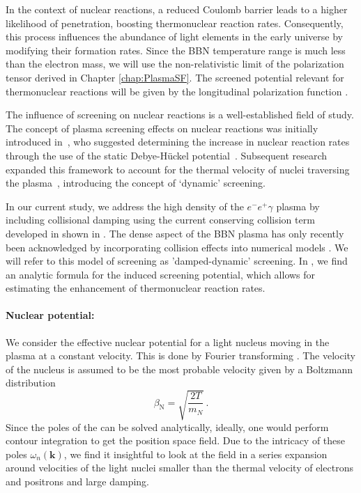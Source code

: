 In the context of nuclear reactions, a reduced Coulomb barrier leads to a higher likelihood of penetration, boosting thermonuclear reaction rates. Consequently, this process influences the abundance of light elements in the early universe by modifying their formation rates. Since the BBN temperature range is much less than the electron mass, we will use the non-relativistic limit of the polarization tensor derived in Chapter \ref{chap:PlasmaSF}. The screened potential relevant for thermonuclear reactions will be given by the longitudinal polarization function .

The influence of screening on nuclear reactions is a well-established field of study. The concept of plasma screening effects on nuclear reactions was initially introduced in~\cite{Salpeter:1954nc}, who suggested determining the increase in nuclear reaction rates through the use of the static Debye-Hückel potential~\cite{Debye:1923,Salpeter:1969apj,Famiano:2016hhs}. Subsequent research expanded this framework to account for the thermal velocity of nuclei traversing the plasma~\cite{Hwang:2021kno,Carraro:1988apj,Gruzinov:1997as,Opher:1999jh,Yao:2016cjs}, introducing the concept of `dynamic' screening. 

In our current study, we address the high density of the $e^-e^+\gamma$ plasma by including collisional damping using the current conserving collision term developed in \cite{Formanek:2021blc} shown in . The dense aspect of the BBN plasma has only recently been acknowledged by incorporating collision effects into numerical models \cite{Sasankan:2019oee,Kedia:2020xdc}. We will refer to this model of screening as 'damped-dynamic' screening. In \cite{Grayson:2023flr}, we find an analytic formula for the induced screening potential, which allows for estimating the enhancement of thermonuclear reaction rates.

\paragraph{Nuclear potential:}\label{sec:DDS}
We consider the effective nuclear potential for a light nucleus moving in the plasma at a constant velocity. This is done by Fourier transforming . The velocity of the nucleus is assumed to be the most probable velocity given by a Boltzmann distribution
\begin{equation}\label{eq:vel}
 \beta_{\text{N}} = \sqrt{\frac{2T}{m_N}}\,. 
\end{equation}
Since the poles of the  can be solved analytically, ideally, one would perform contour integration to get the position space field. Due to the intricacy of these poles $\omega_n(\boldsymbol{k})$, we find it insightful to look at the field in a series expansion around velocities of the light nuclei smaller than the thermal velocity of electrons and positrons and large damping.

